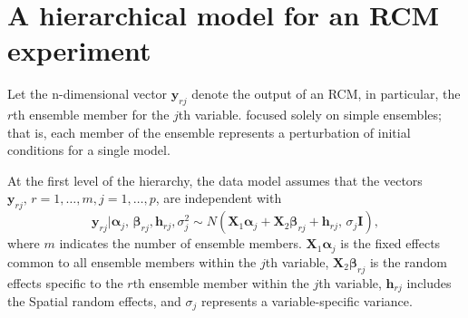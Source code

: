 \documentclass[12pt]{amsart}
\begin{document}
\section{A hierarchical model for an RCM experiment}

Let the n-dimensional vector $\boldsymbol{y}_{rj}$ denote the output of an RCM, in particular, the $r$th ensemble member for the $j$th variable. \cite{paper} focused solely on simple ensembles; that is, each member of the ensemble represents a perturbation of initial conditions for a single model.

At the first level of the hierarchy, the data model assumes that the vectors $\boldsymbol{y}_{rj}, \, r =1, \dots,m,j =1, \dots,p$, are independent with
$$\boldsymbol{y}_{rj} | \boldsymbol{\alpha}_j, \, \boldsymbol{\beta}_{rj}, \boldsymbol{h}_{rj}, \sigma^2_j \sim N(\boldsymbol{X}_1 \boldsymbol{\alpha}_j + \boldsymbol{X}_2 \boldsymbol{\beta}_{rj} + \boldsymbol{h}_{rj}, \, \sigma_j \boldsymbol{I}),$$
where $m$ indicates the number of ensemble members. $\boldsymbol{X}_1 \boldsymbol{\alpha}_j$ is the fixed effects common to all ensemble members within the $j$th variable, $\boldsymbol{X}_2 \boldsymbol{\beta}_{rj}$ is the random effects specific to the $r$th ensemble member within the $j$th variable, $\boldsymbol{h}_{rj}$ includes the Spatial random effects, and $\sigma_j$ represents a variable-specific variance.
\end{document}
